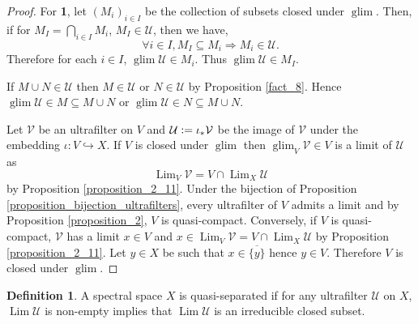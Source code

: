 \documentclass[10pt]{article}
\numberwithin{equation}{section}
\theoremstyle{definition}
\newtheorem{definition}{Definition}[subsection]
\DeclareMathOperator{\Lim}{Lim}
\DeclareMathOperator{\glim}{glim}
\newcommand{\defeq}{\vcentcolon=}
\newcommand{\U}[0]{\mathcal{U}}
\newcommand{\cV}[0]{\mathcal{V}}
\begin{document}
\begin{proof}
    For \textbf{1}, let $(M_i)_{i\in I}$ be the collection of subsets closed under $\glim$. Then, if for $M_I = \bigcap_{i\in I}M_i$, $M_I\in\U$, then we have,
    \begin{equation*}
    \forall i\in I, M_I\subseteq M_i \Rightarrow M_i\in\U.
    \end{equation*}
    Therefore for each $i\in I$, $\glim\U\in M_i$. Thus $\glim\U\in M_I$.
    \par If $M\cup N\in\U$ then $M\in\U$ or $N\in\U$ by Proposition \ref{fact_8}. Hence $\glim\U\in M\subseteq M\cup N$ or $\glim\U\in N\subseteq M\cup N$.
    \par Let $\mathcal{V}$ be an ultrafilter on $V$ and $\mathcal{U}\defeq\iota_*\cV$ be the image of $\mathcal{V}$ under the embedding $\iota:V\hookrightarrow X$. If $V$ is closed under $\glim$ then $\glim_V\mathcal{V}\in V$ is a limit of $\U$ as
    \begin{equation*}
    \Lim_V\mathcal{V} = V\cap\Lim_X\U
    \end{equation*}
    by Proposition \ref{proposition_2_11}.
    Under the bijection of Proposition \ref{proposition_bijection_ultrafilters}, every ultrafilter of $V$ admits a limit and by Proposition \ref{proposition_2}, $V$ is quasi-compact. Conversely, if $V$ is quasi-compact, $\mathcal{V}$ has a limit $x\in V$ and $x\in\Lim_V\mathcal{V} = V\cap\Lim_X\mathcal{U}$ by Proposition \ref{proposition_2_11}. Let $y\in X$ be such that $x\in\overline{\{y\}}$ hence $y\in V$. Therefore $V$ is closed under $\glim$.
\end{proof}

\begin{definition}
    A spectral space $X$ is quasi-separated if for any ultrafilter $\U$ on $X$, $\Lim\U$ is non-empty implies that $\Lim\U$ is an irreducible closed subset.
\end{definition}
\end{document}
